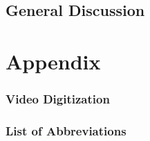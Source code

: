 \documentclass[12pt,a4paper,twoside]{report}
\newcommand\cleartorightpage{%
\ifodd\value{page}\hbox{}\clearpage\else\hbox{}\cleardoublepage\fi
\hbox{}
}
\begin{document}
\chapter{General Discussion}\label{cpt:generaldiscussion}
\clearpage





\cleartorightpage
\part{Appendix}\label{acknowledgements}





\clearpage
\section{Video Digitization}\label{cpt:digitization}


\clearpage
\section{List of Abbreviations}\label{abbreviations}

\end{document}
